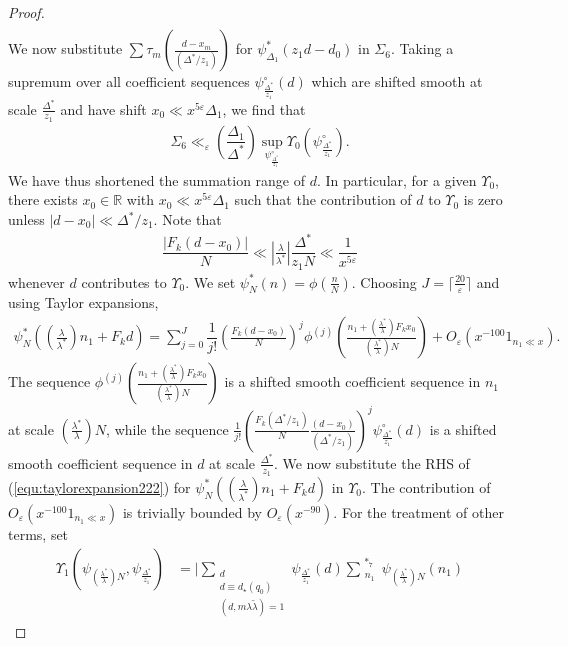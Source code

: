 \documentclass{amsart}
\numberwithin{equation}{section}
\begin{document}
\begin{proof}
\begin{align*}
\end{align*}
We now substitute $\sum \tau_m(\frac{d-x_m}{(\Delta^*/z_1)})$ for $\psi^*_{\Delta_1}(z_1d-d_0)$ in $\Sigma_6$. Taking a supremum over all   coefficient sequences $\psi^\circ_{\frac{\Delta^*}{z_1}}(d)$ which are shifted smooth at scale $\frac{\Delta^*}{z_1}$ and have shift $x_0 \ll x^{5\varepsilon}\Delta_1$, we find that
 \begin{align*}
 \Sigma_6 \ll_\varepsilon \left(\dfrac{\Delta_1}{\Delta^*}\right) \sup_{\psi^\circ_{\frac{\Delta^*}{z_1}}} \Upsilon_0(\psi^\circ_{\frac{\Delta^*}{z_1}}).
 \end{align*}
We have thus shortened the summation range of $d$. In particular, for a given $\Upsilon_0$, there exists $x_0 \in \mathbb{R}$  with $x_0 \ll x^{5\varepsilon}\Delta_1$ such that the contribution of $d$ to $\Upsilon_0$ is zero unless $|d-x_0| \ll \Delta^*/z_1$.  Note that 
  \begin{align*}
 \dfrac{ |F_k (d-x_0)|}{N} \ll \left|\frac{\lambda}{\lambda^*}\right|\dfrac{\Delta^*}{z_1 N} \ll \dfrac{1}{x^{5\varepsilon}}
  \end{align*}
  whenever $d$ contributes to $\Upsilon_0$.   We set $\psi^*_N(n) = \phi(\frac{n}{N})$. 
Choosing $J= \lceil \frac{20}{\varepsilon} \rceil$ and using Taylor expansions,  
\begin{align} \label{equ:taylorexpansion222}
\psi_N^*\!\left(\left(\tfrac{\lambda}{\lambda^*}\right)n_1+F_k d\right)= \sum_{j=0}^J  \dfrac{1}{j!} \left( \frac{F_k (d-x_0)}{N}  \right)^j \phi^{(j)}\left(\frac{n_1 + (\frac{\lambda^*}{\lambda})F_k x_0}{(\frac{\lambda^*}{\lambda}) N}  \right) + O_\varepsilon(x^{-100} 1_{n_1 \ll x}).
\end{align}
The sequence $\phi^{(j)}(\frac{n_1 + (\frac{\lambda^*}{\lambda})F_k x_0}{(\frac{\lambda^*}{\lambda}) N})$ is a shifted smooth coefficient sequence in $n_1$ at scale $(\frac{\lambda^*}{\lambda})N$, while the sequence 
$\frac{1}{j!}\left(\frac{F_k (\Delta^*/z_1)}{N}\frac{(d-x_0)}{(\Delta^*/z_1)}\right)^j\psi^\circ_{\frac{\Delta^*}{z_1}}(d)$ is a shifted smooth coefficient sequence in $d$ at scale $\frac{\Delta^*}{z_1}$.   We now substitute the RHS of (\ref{equ:taylorexpansion222}) for   $\psi_N^*((\frac{\lambda}{\lambda^*})n_1 + F_k d)$ in $\Upsilon_0$. 
 The contribution of $O_\varepsilon(x^{-100}1_{n_1 \ll x})$  is trivially bounded by  $O_\varepsilon(x^{-90})$. For the treatment of other terms, set 
 \begin{align*}
\Upsilon_1(\psi_{(\frac{\lambda^*}{\lambda})N},\psi_{\frac{\Delta^*}{z_1}}) &= \Bigg|\!\!\! \sum_{\substack{d \\ d \equiv d_\star (q_0) \\  (d, m \lambda \widetilde{\lambda})=1 }} \!\!\!\!\!\psi_{\frac{\Delta^*}{z_1}}(d) \sum_{\substack{n_1  }}^{\,\,*_7} \psi_{(\frac{\lambda^*}{\lambda})N}(n_1)

\end{align*}
\end{proof}
\end{document}
